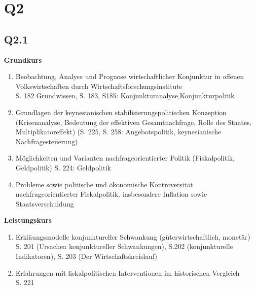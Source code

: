 \documentclass[12pt, letterpaper]{article}
\begin{document}
\section{Q2}
\label{sec:Q2}
\subsection{Q2.1}
\label{sec:Q2.1}
\textbf{Grundkurs} 
\begin{enumerate}
  \item Beobachtung, Analyse und Prognose wirtschaftlicher Konjunktur in offenen Volkswirtschaften durch Wirtschaftsforschungsinstitute\\
    S. 182 Grundwissen, S. 183, S185: Konjunkturanalyse,Konjunkturpolitik
    \item Grundlagen der keynesianischen stabilisierungspolitischen Konzeption (Krisenanalyse, Bedeutung der effektiven Gesamtnachfrage, Rolle des Staates, Multiplikatoreffekt) (S. 225, S. 258: Angebotspolitik, keynesianische Nachfragesteuerung)
    \item Möglichkeiten und Varianten nachfrageorientierter Politik (Fiskalpolitik, Geldpolitik) S. 224: Geldpolitik
    
    \item Probleme sowie politische und ökonomische Kontroversität nachfrageorientierter Fiskalpolitik, insbesondere Inflation sowie Staatsverschuldung\\
\end{enumerate}
\textbf{Leistungskurs} 
\begin{enumerate}
  \item Erkläungsmodelle konjunktureller Schwankung (güterwirtschaftlich, monetär)\\
    S. 201 (Ursachen konjunktureller Schwankungen), S.202 (konjunkturelle Indikatoren), S. 203 (Der Wirtschaftskreislauf)
  \item Erfahrungen mit fiskalpolitischen Interventionen im historischen Vergleich\\ S. 221
\end{enumerate}
\end{document}
